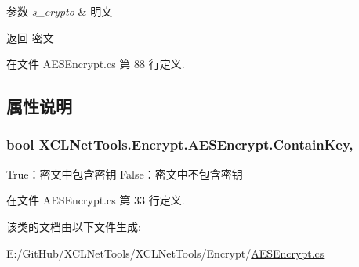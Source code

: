 \begin{DoxyParams}{参数}
{\em s\+\_\+crypto} & 明文\\
\hline
\end{DoxyParams}
\begin{DoxyReturn}{返回}
密文
\end{DoxyReturn}


在文件 A\+E\+S\+Encrypt.\+cs 第 88 行定义.



\subsection{属性说明}
\subsubsection[{\texorpdfstring{Contain\+Key}{ContainKey}}]{\setlength{\rightskip}{0pt plus 5cm}bool X\+C\+L\+Net\+Tools.\+Encrypt.\+A\+E\+S\+Encrypt.\+Contain\+Key\hspace{0.3cm}{\ttfamily [get]}, {\ttfamily [set]}}\hypertarget{class_x_c_l_net_tools_1_1_encrypt_1_1_a_e_s_encrypt_aff7c2c090ff50543aa60c0c5895b8a1e}{}\label{class_x_c_l_net_tools_1_1_encrypt_1_1_a_e_s_encrypt_aff7c2c090ff50543aa60c0c5895b8a1e}


True：密文中包含密钥 False：密文中不包含密钥 



在文件 A\+E\+S\+Encrypt.\+cs 第 33 行定义.



该类的文档由以下文件生成\+:\begin{DoxyCompactItemize}
\item 
E\+:/\+Git\+Hub/\+X\+C\+L\+Net\+Tools/\+X\+C\+L\+Net\+Tools/\+Encrypt/\hyperlink{_a_e_s_encrypt_8cs}{A\+E\+S\+Encrypt.\+cs}\end{DoxyCompactItemize}
